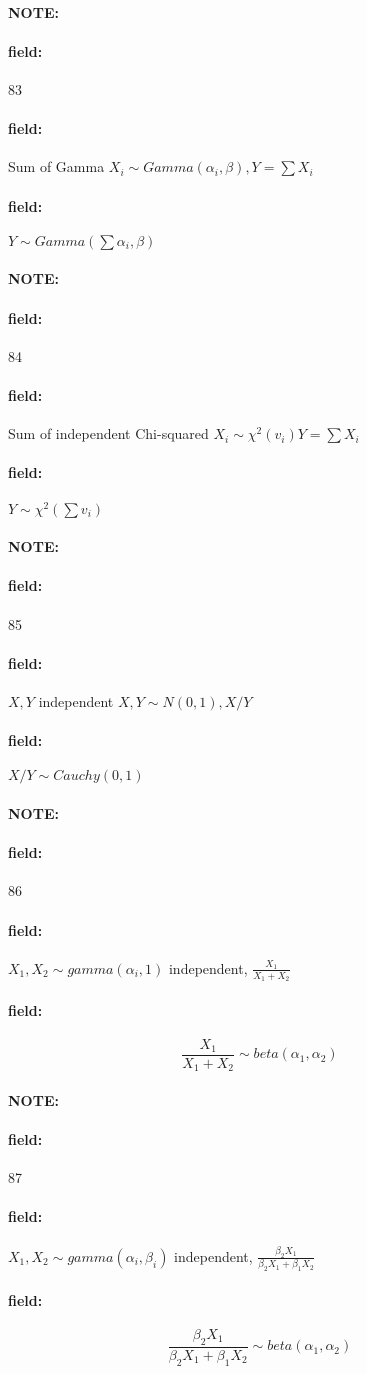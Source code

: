 \documentclass[12pt]{article}
\newenvironment{note}{\paragraph{NOTE:}}{}
\newenvironment{field}{\paragraph{field:}}{}
\begin{document}
\begin{note} \begin{field} \tiny 83 \end{field}
  \begin{field}
    Sum of Gamma
    $X_i \sim Gamma(\alpha_i, \beta), Y = \sum X_i$
  \end{field}
  \begin{field}
    $Y \sim Gamma(\sum \alpha_i, \beta)$
  \end{field}
\end{note}

\begin{note} \begin{field} \tiny 84 \end{field}
  \begin{field}
    Sum of independent Chi-squared
    $ X_i \sim \chi^2(v_i) Y = \sum X_i$
  \end{field}
  \begin{field}
    $Y \sim \chi^2(\sum v_i)$
  \end{field}
\end{note}


\begin{note} \begin{field} \tiny 85 \end{field}
  \begin{field}
    $X,Y$ independent
    $X,Y \sim N(0,1), X/Y$
  \end{field}
  \begin{field}
    $X/Y \sim Cauchy(0,1)$
  \end{field}
\end{note}





\begin{note} \begin{field} \tiny 86 \end{field}
  \begin{field}
    $X_1,X_2 \sim gamma(\alpha_i,1)$ independent, $\frac{X_1}{X_1 + X_2} $
  \end{field}
  \begin{field}
    $$ \frac{X_1}{X_1 + X_2} \sim beta(\alpha_1,\alpha_2)$$
  \end{field}
\end{note}

\begin{note} \begin{field} \tiny 87 \end{field}
  \begin{field}
    $X_1,X_2 \sim gamma(\alpha_i,\beta_i)$ independent, $\frac{\beta_2X_1}{\beta_2X_1 + \beta_1X_2} $
  \end{field}
  \begin{field}
    $$ \frac{\beta_2X_1}{\beta_2X_1 + \beta_1X_2}\sim beta(\alpha_1,\alpha_2)$$
  \end{field}
\end{note}
\end{document}
